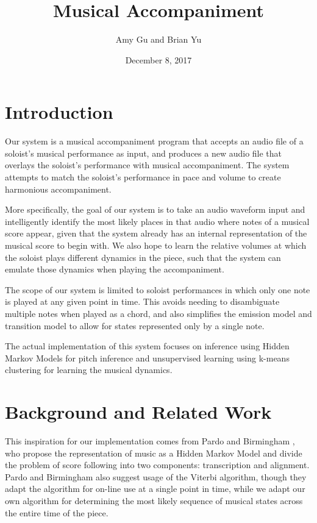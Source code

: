 \documentclass[11pt]{article}
\title{Musical Accompaniment}
\author{Amy Gu and Brian Yu}
\date{December 8, 2017}
\begin{document}
\maketitle{}


\section{Introduction}

Our system is a musical accompaniment program that accepts
an audio file of a soloist's musical performance as input,
and produces a new audio file that overlays the soloist's performance
with musical accompaniment. The system attempts to match the soloist's
performance in pace and volume to create harmonious accompaniment.

More specifically, the goal of our system is to take an
audio waveform input and intelligently identify the most likely
places in that audio where notes of a musical score appear,
given that the system already has an internal representation
of the musical score to begin with. We also hope to learn the
relative volumes at which the soloist plays different dynamics
in the piece, such that the system can emulate those dynamics
when playing the accompaniment.

The scope of our system is limited to soloist performances in which
only one note is played at any given point in time.
This avoids needing to disambiguate multiple notes when played
as a chord, and also simplifies the emission model and
transition model to allow for
states represented only by a single note.

The actual implementation of this system focuses on inference
using Hidden Markov Models for pitch inference and unsupervised
learning using k-means clustering for learning the musical
dynamics.

\section{Background and Related Work}

This inspiration for our implementation comes from Pardo and Birmingham
\cite{pardo}, who propose the representation of music as a Hidden
Markov Model and divide the problem of score following into two
components: transcription and alignment.
Pardo and Birmingham also suggest usage of the Viterbi algorithm,
though they adapt the algorithm for on-line use at a single point
in time, while we adapt our own algorithm for determining the
most likely sequence of musical states across the entire time
of the piece.
\end{document}

